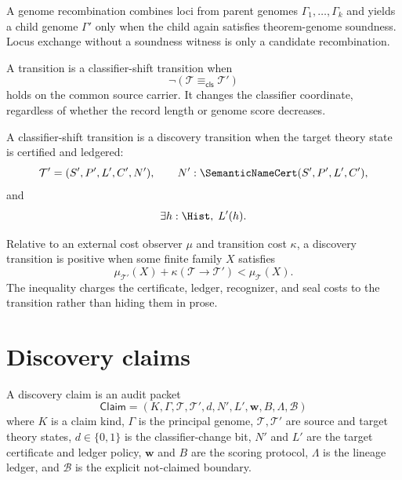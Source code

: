 \begin{definition}
\label{def:automated-discovery-genome-recombination}
A genome recombination combines loci from parent genomes
$\Gamma_1,\ldots,\Gamma_k$ and yields a child genome $\Gamma'$ only when the
child again satisfies theorem-genome soundness. Locus exchange without a
soundness witness is only a candidate recombination.
\end{definition}

\begin{definition}
\label{def:automated-discovery-classifier-shift}
A transition is a classifier-shift transition when
$$
\neg(\mathcal T\equiv_{\mathsf{cls}}\mathcal T')
$$
holds on the common source carrier. It changes the classifier coordinate,
regardless of whether the record length or genome score decreases.
\end{definition}

\begin{definition}
\label{def:automated-discovery-discovery-transition}
A classifier-shift transition is a discovery transition when the target theory
state is certified and ledgered:
$$
\mathcal T'=(S',P',L',C',N'),
\qquad
N':\SemanticNameCert(S',P',L',C'),
$$
and
$$
\exists h:\Hist,\;L'(h).
$$
\end{definition}

\begin{definition}
\label{def:automated-discovery-positive-discovery-transition}
Relative to an external cost observer $\mu$ and transition cost $\kappa$, a
discovery transition is positive when some finite family $X$ satisfies
$$
\mu_{\mathcal T'}(X)+\kappa(\mathcal T\to\mathcal T')
<
\mu_{\mathcal T}(X).
$$
The inequality charges the certificate, ledger, recognizer, and seal costs to
the transition rather than hiding them in prose.
\end{definition}

\section{Discovery claims}
\label{sec:automated-discovery-claims}

\begin{definition}
\label{def:automated-discovery-claim}
A discovery claim is an audit packet
$$
\mathsf{Claim}=
(K,\Gamma,\mathcal T,\mathcal T',d,N',L',\mathbf w,B,\Lambda,\mathcal B)
$$
where $K$ is a claim kind, $\Gamma$ is the principal genome,
$\mathcal T,\mathcal T'$ are source and target theory states,
$d\in\{0,1\}$ is the classifier-change bit, $N'$ and $L'$ are the target
certificate and ledger policy, $\mathbf w$ and $B$ are the scoring protocol,
$\Lambda$ is the lineage ledger, and $\mathcal B$ is the explicit
not-claimed boundary.
\end{definition}

